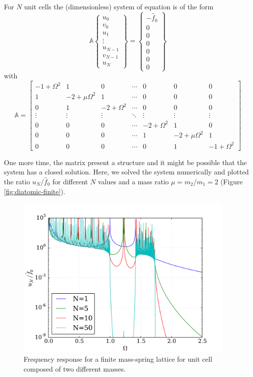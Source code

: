 \documentclass[12pt,letterpaper]{article}
\begin{document}
For $N$ unit cells the (dimensionless) system of equation is of the form
\begin{equation}
\mathbb{A}
\begin{Bmatrix}
u_0 \\ 
v_0 \\ 
u_1 \\ 
\vdots \\ 
u_{N-1} \\ 
v_{N-1} \\ 
u_N
\end{Bmatrix} = 
\begin{Bmatrix}
-\hat{f}_0 \\ 
0 \\ 
0 \\ 
0 \\ 
0 \\ 
0 \\ 
0
\end{Bmatrix}
\end{equation}
with
\[\mathbb{A} = \begin{bmatrix}
-1 + \Omega^2 & 1 & 0 & \cdots & 0 & 0 & 0 \\ 
1 & -2 +\mu \Omega^2 & 1 & \cdots & 0 & 0 & 0 \\ 
0 & 1 & -2 + \Omega^2 & \cdots & 0 & 0 & 0 \\ 
\vdots & \vdots & \vdots & \ddots & \vdots & \vdots & \vdots \\ 
0 & 0 & 0 & \cdots & -2 + \Omega^2 & 1 & 0 \\ 
0 & 0 & 0 & \cdots & 1 & -2 +\mu \Omega^2 & 1 \\ 
0 & 0 & 0 & \cdots & 0 & 1 & -1 + \Omega^2
\end{bmatrix} \]


One more time, the matrix present a structure and it might be  possible that the system has a closed solution. Here, we solved the system numerically and plotted the ratio $u_N/\hat{f}_0$ for different $N$ values and a mass ratio $\mu=m_2/m_1=2$ (Figure \ref{fig:diatomic-finite}).
\begin{figure}[h]
\centering
\includegraphics[height=8cm]{img/diatomic_finite.pdf} 
\caption{Frequency response for a finite mass-spring lattice for unit cell composed of two different masses.}
\label{fig:diatomic-finite-disp}
\end{figure}
\end{document}

